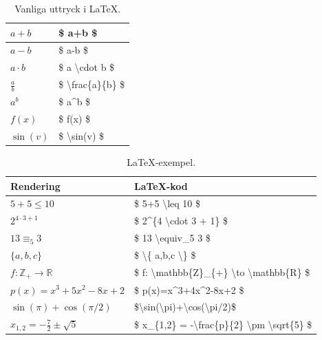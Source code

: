 \documentclass[titlepage]{article}
\begin{document}
\begin{table}[h]
\begin{minipage}[b]{.5\linewidth}
\begin{center}
\begin{tabular}{| l | l |}
            \hline
            $a+b$ & \$ a+b \$ \\
            \hline
            $a-b$ & \$ a-b \$ \\
            \hline
            $a \cdot b$ & \$ a \textbackslash cdot b \$ \\
            \hline
            $\frac{a}{b}$ & \$ \textbackslash frac\{a\}\{b\} \$ \\
            \hline
            $a^b$ & \$ a\textasciicircum b \$ \\
            \hline
            $f(x)$ & \$ f(x) \$ \\
            \hline
            $\sin(v)$ & \$ \textbackslash sin(v) \$ \\
            \hline
        \end{tabular}
        \caption{Vanliga uttryck i \LaTeX.}
        \label{t2}
    \end{center}
\end{minipage}
\end{table}

\begin{table}[H]
    \begin{center}
        \begin{tabular}{| l | l |}
            \hline
            \textbf{Rendering} & \textbf{\LaTeX-kod} \\
            \hline
            $5+5 \leq 10$ & \$ 5+5 \textbackslash leq 10 \$ \\
            \hline
            $2^{4\cdot3 + 1}$ & \$ 2\textasciicircum \{4 \textbackslash cdot 3 + 1\} \$ \\
            \hline
            $13 \equiv_5 3$ & \$ 13 \textbackslash equiv\_5 3 \$ \\
            \hline
            $\{a,b,c\}$ & \$ \textbackslash\{ a,b,c \textbackslash\} \$ \\
            \hline
            $f:\mathbb{Z}_{+} \to \mathbb{R}$ & \$ f: \textbackslash mathbb\{Z\}\_\{+\} \textbackslash to \textbackslash mathbb\{R\} \$ \\
            \hline
            $p(x)=x^3+5x^2-8x+2$ & \$ p(x)=x\textasciicircum 3+4x\textasciicircum 2-8x+2 \$ \\
            \hline
            $\sin(\pi)+\cos(\pi/2)$ & \$\textbackslash sin(\textbackslash pi)+\textbackslash cos(\textbackslash pi/2)\$ \\
            \hline
            $x_{1,2} = -\frac{7}{2} \pm \sqrt{5}$ & \$ x\_\{1,2\} = -\textbackslash frac\{p\}\{2\} \textbackslash pm \textbackslash sqrt\{5\} \$ \\
            \hline
        \end{tabular}
        \caption{\LaTeX-exempel.}
        \label{t3}
    \end{center}
\end{table}
\end{document}
